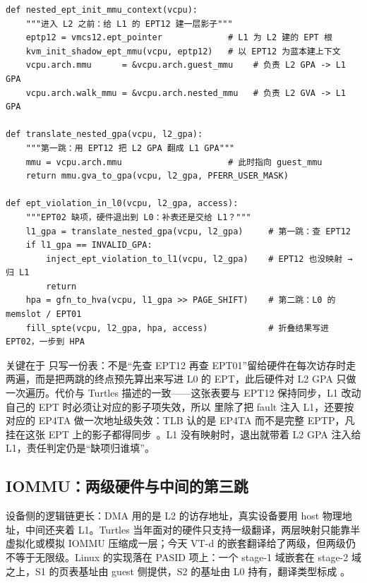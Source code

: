 \begin{lstlisting}[caption={EPT 叠 EPT 的初始化与缺项补齐。依据 arch/x86/kvm/vmx/nested.c（nested\_ept\_init\_mmu\_context、nested\_ept\_inject\_page\_fault）、arch/x86/kvm/mmu/mmu.c（kvm\_init\_shadow\_ept\_mmu）、arch/x86/kvm/x86.c（translate\_nested\_gpa）整理。},label={lst:nested-ept},style=pseudopy]
def nested_ept_init_mmu_context(vcpu):
    """进入 L2 之前：给 L1 的 EPT12 建一层影子"""
    eptp12 = vmcs12.ept_pointer             # L1 为 L2 建的 EPT 根
    kvm_init_shadow_ept_mmu(vcpu, eptp12)   # 以 EPT12 为蓝本建上下文
    vcpu.arch.mmu      = &vcpu.arch.guest_mmu    # 负责 L2 GPA -> L1 GPA
    vcpu.arch.walk_mmu = &vcpu.arch.nested_mmu   # 负责 L2 GVA -> L1 GPA

def translate_nested_gpa(vcpu, l2_gpa):
    """第一跳：用 EPT12 把 L2 GPA 翻成 L1 GPA"""
    mmu = vcpu.arch.mmu                     # 此时指向 guest_mmu
    return mmu.gva_to_gpa(vcpu, l2_gpa, PFERR_USER_MASK)

def ept_violation_in_l0(vcpu, l2_gpa, access):
    """EPT02 缺项，硬件退出到 L0：补表还是交给 L1？"""
    l1_gpa = translate_nested_gpa(vcpu, l2_gpa)     # 第一跳：查 EPT12
    if l1_gpa == INVALID_GPA:
        inject_ept_violation_to_l1(vcpu, l2_gpa)    # EPT12 也没映射 → 归 L1
        return
    hpa = gfn_to_hva(vcpu, l1_gpa >> PAGE_SHIFT)    # 第二跳：L0 的 memslot / EPT01
    fill_spte(vcpu, l2_gpa, hpa, access)            # 折叠结果写进 EPT02，一步到 HPA
\end{lstlisting}

关键在于  只写一份表：不是“先查 EPT12 再查 EPT01”留给硬件在每次访存时走两遍，而是把两跳的终点预先算出来写进 L0 的 EPT，此后硬件对 L2 GPA 只做一次遍历。代价与 Turtles 描述的一致——这张表要与 EPT12 保持同步，L1 改动自己的 EPT 时必须让对应的影子项失效，所以  里除了把 fault 注入 L1，还要按  对应的 EP4TA 做一次地址级失效：TLB 认的是 EP4TA 而不是完整 EPTP，凡挂在这张 EPT 上的影子都得同步~\cite{source5}。L1 没有映射时，退出就带着 L2 GPA 注入给 L1，责任判定仍是“缺项归谁填”。

\subsection{IOMMU：两级硬件与中间的第三跳}\label{sec:nested-code-iommu}

设备侧的逻辑链更长：DMA 用的是 L2 的访存地址，真实设备要用 host 物理地址，中间还夹着 L1。Turtles 当年面对的硬件只支持一级翻译，两层映射只能靠半虚拟化或模拟 IOMMU 压缩成一层；今天 VT-d 的嵌套翻译给了两级，但两级仍不等于无限级。Linux 的实现落在 PASID 项上：一个 stage-1 域嵌套在 stage-2 域之上，S1 的页表基址由 guest 侧提供，S2 的基址由 L0 持有，翻译类型标成 。

